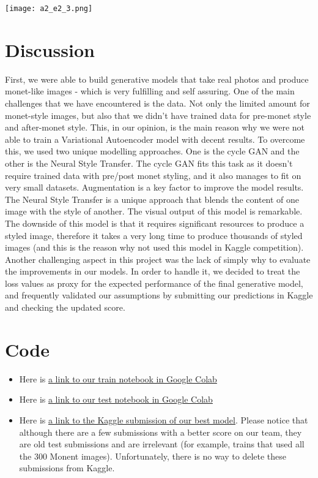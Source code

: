 \documentclass{article}
\begin{document}
\begin{center}
    \texttt{[image: a2\_e2\_3.png]}
\end{center}

\section{Discussion}
First, we were able to build generative models that take real photos and produce monet-like images - which is very fulfilling and self assuring.
One of the main challenges that we have encountered is the data. Not only the limited amount for monet-style images, but also that we didn’t have trained data for pre-monet style and after-monet style. This, in our opinion, is the main reason why we were not able to train a Variational Autoencoder model with decent results.
To overcome this, we used two unique modelling approaches. One is the cycle GAN and the other is the Neural Style Transfer. The cycle GAN fits this task as it doesn’t require trained data with pre/post monet styling, and it also manages to fit on very small datasets. Augmentation is a key factor to improve the model results.
The Neural Style Transfer is a unique approach that blends the content of one image with the style of another. The visual output of this model is remarkable. The downside of this model is that it requires significant resources to produce a styled image, therefore it takes a very long time to produce thousands of styled images (and this is the reason why not used this model in Kaggle competition).
Another challenging aspect in this project was the lack of simply why to evaluate the improvements in our models. In order to handle it, we decided to treat the loss values as proxy for the expected performance of the final generative model, and frequently validated our assumptions by submitting our predictions in Kaggle and checking the updated score.


\section{Code}
\begin{itemize}
    \item Here is \href{https://colab.research.google.com/drive/1HVOYKNO_Wr5gIPydsSINsGEhfxGbsWXr?usp=sharing#scrollTo=v9tkeXavuGw4}{a link to our train notebook in Google Colab}
    \item Here is \href{https://colab.research.google.com/drive/1bUns3iR8ry2VXhK1my2tNdfTAdPVunqJ#scrollTo=LEw570hXlqdq}{a link to our test notebook in Google Colab}
    \item Here is \href{https://www.kaggle.com/code/itaysstorage/notebookaffcb41770?scriptVersionId=119540087}{a link to the Kaggle submission of our best model}. Please notice that although there are a few submissions with a better score on our team, they are old test submissions and are irrelevant (for example, trains that used all the 300 Monent images). Unfortunately, there is no way to delete these submissions from Kaggle.
\end{itemize}




\end{document}
